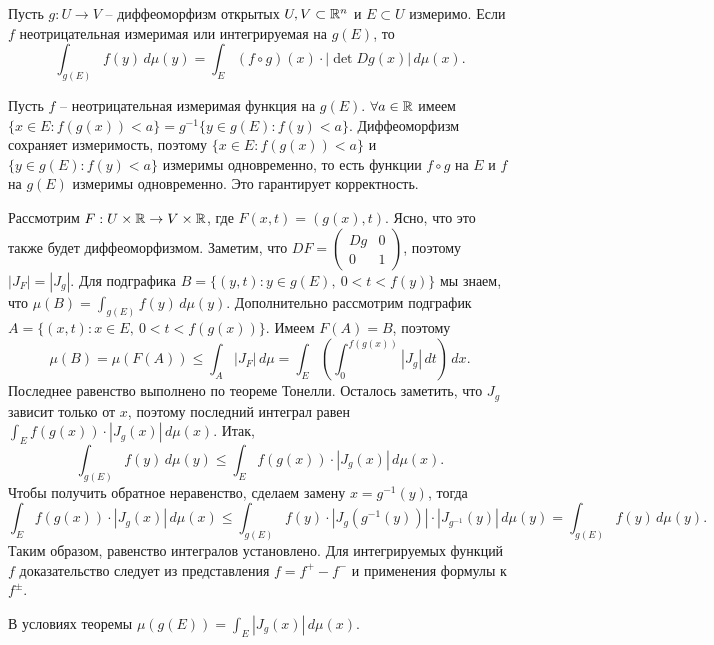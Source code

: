  \begin{reminder}
    Пусть $g : U \to V$ -- диффеоморфизм открытых $U, V \subset \mathbb{R}^n$ и $E \subset U$ измеримо. 
    Если $f$ неотрицательная измеримая или интегрируемая на $g(E)$, то 
    \[ \int_{g(E)} f(y) \, d\mu(y) = \int_{E} (f \circ g)(x) \cdot |\det Dg(x)| \, d\mu(x). \]
\end{reminder}

\begin{myproof}
	Пусть $f$ -- неотрицательная измеримая функция на $g(E)$.
	$\forall a \in \mathbb{R}$ 
	имеем $\{x \in E : f(g(x)) < a\} = g^{-1} \{y \in g(E) : f(y) < a\}$. 
	Диффеоморфизм сохраняет измеримость, поэтому $\{x \in E : f(g(x)) < a\}$ и $\{y \in g(E) : f(y) < a\}$ измеримы одновременно, то есть функции $f \circ g$ на $E$ и $f$ на $g(E)$ измеримы одновременно.
	Это гарантирует корректность. 

	\vspace{5pt}
	Рассмотрим $F : U \times \mathbb{R} \to V \times \mathbb{R}$, где $F(x, t) = (g(x), t)$. 
	Ясно, что это также будет диффеоморфизмом. Заметим, что 
	$DF = \begin{pmatrix}
		Dg & 0 \\ 
		0 & 1 
	\end{pmatrix}$, 
	поэтому $|J_F| = |J_g|$.
	Для подграфика $B = \{(y, t) : y \in g(E), \ 0 < t < f(y)\}$ мы знаем, что $\mu(B) = \int_{g(E)} f(y) \, d\mu(y)$. 
	Дополнительно рассмотрим подграфик $A = \{(x, t) : x \in E, \ 0 < t < f(g(x))\}$. %
	Имеем $F(A) = B$, поэтому
	\[ \mu(B) = \mu(F(A)) \leq \int_{A} |J_F| \, d\mu = \int_{E} \left( \int_0^{f(g(x))} |J_g| \, dt \right) \, dx. \]
	Последнее равенство выполнено по теореме Тонелли. Осталось заметить, что $J_g$ зависит только от $x$, поэтому 
	последний интеграл равен $\int_{E} f(g(x)) \cdot |J_g(x)| \, d\mu(x)$. 
	Итак, 
	\[ \int_{g(E)} f(y) \, d\mu(y) \leq \int_{E} f(g(x)) \cdot |J_g(x)| \, d\mu(x). \]
	Чтобы получить обратное неравенство, сделаем замену $x = g^{-1}(y)$, тогда 
	\[ \int_{E} f(g(x)) \cdot |J_g(x)| \, d\mu(x) \leq \int_{g(E)} f(y) \cdot |J_g(g^{-1}(y))| \cdot |J_{g^{-1}} (y)| \, d\mu(y) = \int_{g(E)} f(y) \, d\mu(y). \]
	Таким образом, равенство интегралов установлено.
	Для интегрируемых функций $f$ доказательство следует из представления $f = f^+ - f^-$ и применения формулы к $f^{\pm}$.
\end{myproof}

\begin{corollary}
	В условиях теоремы 
	$\mu(g(E)) = \int_{E} |J_g(x)| \, d\mu(x)$. 
\end{corollary}

